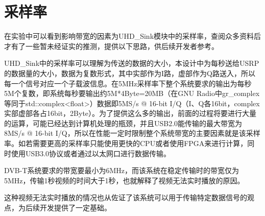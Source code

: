 	\section{采样率}
		\label{sec:sample_rate}
		\par 在实验中可以看到影响带宽的因素为UHD\_Sink模块中的采样率，查阅众多资料后才有了一些暂未经证实的推测，提供以下思路，供后续开发者参考。
		\par UHD\_Sink中的采样率可以理解为传送的数据的大小，本设计中为每秒送给USRP的数据量的大小，数据为复数形式，其中实部作为I路，虚部作为Q路送入，所以每一个信号对应一个子载波信息。在5MHz采样率下整个系统要求的输出为每秒5M个复数，即系统每秒要输出约5M*4Byte=20MB（在GNU Radio中gr\_complex等同于std::complex<float>）数据即5MS/s @ 16-bit I/Q（I、Q各16bit，complex实部虚部各占16bit，2Byte）。为了提供这么多的输出，前面的过程将要进行大量的运算，可能已经达到计算机处理的瓶颈，并且USB2.0能传输的最大带宽为8MS/s @ 16-bit I/Q，所以在性能一定时限制整个系统带宽的主要因素就是该采样率。如若需要更高的采样率只能使用更快的CPU或者使用FPGA来进行计算，同时使用USB3.0协议或者通过以太网口进行数据传输。
		\par DVB-T系统要求的带宽要最小为6MHz，而该系统在稳定传输时的带宽仅为5MHz，传输1秒视频的时间大于1秒，也就解释了视频无法实时播放的原因。
		\par 这种视频无法实时播放的情况也从佐证了该系统可以用于传输特定数据信号的观点，为后续开发提供了一定基础。

